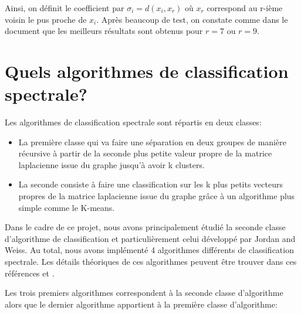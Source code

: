 \medskip

Ainsi, on définit le coefficient par $\sigma_i = d(x_i,x_r)$ où $x_r$ correspond au r-ième voisin le pus proche de $x_i$. Après beaucoup de test, on constate comme dans le document \cite{tartare2014contribution} que les meilleurs résultats sont obtenus pour $r=7$ ou $r=9$.




\chapter{Quels algorithmes de classification spectrale?}


Les algorithmes de classification spectrale sont répartis en deux classes:

\begin{itemize}
\item La première classe qui va faire une séparation en deux groupes de manière récursive à partir de la seconde plus petite valeur propre de la matrice laplacienne issue du graphe jusqu'à avoir k clusters.
\item La seconde consiste à faire une classification sur les k plus petits vecteurs propres de la matrice laplacienne issue du graphe grâce à un algorithme plus simple comme le K-means.
\end{itemize}

\medskip


Dans le cadre de ce projet, nous avons principalement étudié la seconde classe d'algorithme de classification et particulièrement celui développé par Jordan and Weiss. Au total, nous avons implémenté 4 algorithmes différents de classification spectrale. Les détails théoriques de ces algorithmes peuvent être trouver dans ces références \cite{von2007tutorial} et \cite{shi2000normalized}.

\medskip

Les trois premiers algorithmes correspondent à la seconde classe d'algorithme alors que le dernier algorithme appartient à la première classe d'algorithme:

